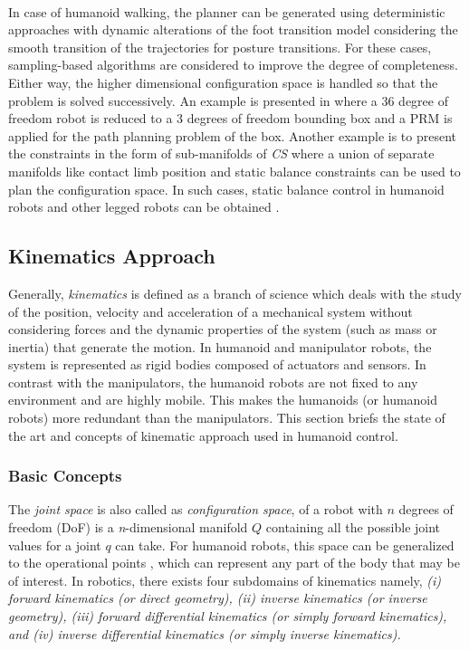 ~

In case of humanoid walking, the planner can be generated using deterministic approaches with dynamic alterations of the foot transition model considering
the smooth transition of the trajectories for posture transitions. For these cases, sampling-based algorithms are considered to improve the degree of completeness.
Either way, the higher dimensional configuration space is handled so that the problem is solved successively. An example is presented in \cite{yoshida2008planning} where a 36 degree of freedom
robot is reduced to a 3 degrees of freedom bounding box and a PRM is applied for the path planning problem of the box. Another example is to present the
constraints in the form of sub-manifolds of \textit{CS} where a union of separate manifolds like contact limb position and static balance constraints can be 
used to plan the configuration space. In such cases, static balance control in humanoid robots and other legged robots can be obtained \cite{hauser2010multi}.

\subsection{Kinematics Approach}

Generally, \textit{kinematics} is defined as a branch of science which deals with the study of the position, velocity and acceleration of a mechanical system without
considering forces and the dynamic properties of the system (such as mass or inertia) that generate the motion. In humanoid and manipulator robots, the system is 
represented as rigid bodies composed of actuators and sensors. In contrast with the manipulators, the humanoid robots are not fixed to any environment and are highly mobile.
This makes the humanoids (or humanoid robots) more redundant than the manipulators. This section briefs the state of the art and concepts of kinematic approach used in
humanoid control.

\subsubsection{Basic Concepts}

The \textit{joint space} is also called as \textit{configuration space}, of a robot with $n$ degrees of freedom (DoF) is a \textit{n}-dimensional manifold $\mathit{Q}$ containing 
all the possible joint values for a joint $q$ can take. For humanoid robots, this space can be generalized to the operational points \cite{khatib1987unified}, which can represent any part of the body
that may be of interest. In robotics, there exists four subdomains of kinematics namely,  \textit{\textit{(i)} forward kinematics (or direct geometry), \textit{(ii)} inverse kinematics
(or inverse geometry), \textit{(iii)} forward differential kinematics (or simply forward kinematics), and \textit{(iv)} inverse differential kinematics (or simply inverse kinematics).}

